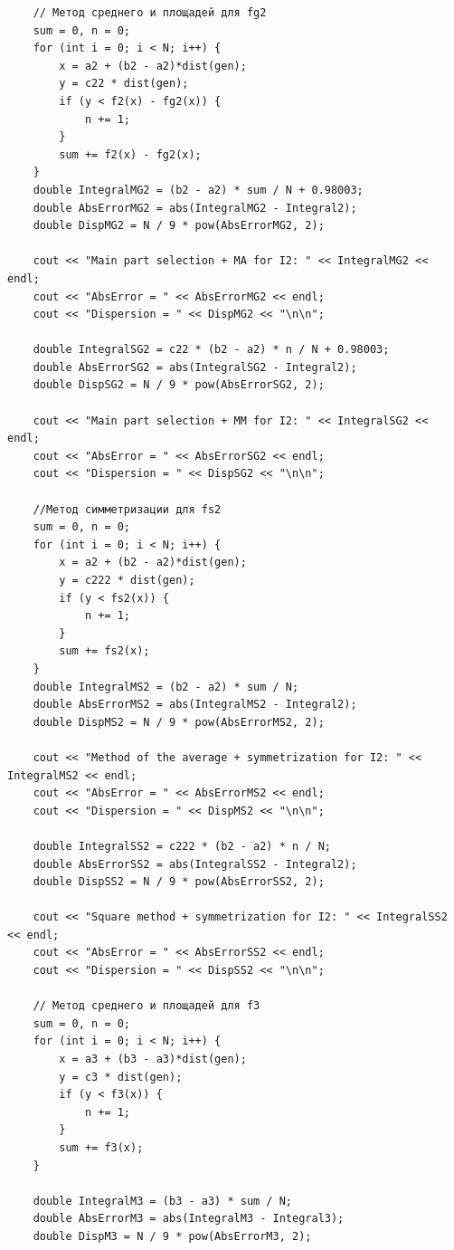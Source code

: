 \documentclass[
11pt,
master, %
subf, %
href, %
colorlinks=true, %
times, %
]{disser}
\begin{document}
{\begin{verbatim}
    // Метод среднего и площадей для fg2
    sum = 0, n = 0;
    for (int i = 0; i < N; i++) {
        x = a2 + (b2 - a2)*dist(gen);
        y = c22 * dist(gen);
        if (y < f2(x) - fg2(x)) {
            n += 1;
        }
        sum += f2(x) - fg2(x);
    }
    double IntegralMG2 = (b2 - a2) * sum / N + 0.98003;
    double AbsErrorMG2 = abs(IntegralMG2 - Integral2);
    double DispMG2 = N / 9 * pow(AbsErrorMG2, 2);

    cout << "Main part selection + MA for I2: " << IntegralMG2 << endl;
    cout << "AbsError = " << AbsErrorMG2 << endl;
    cout << "Dispersion = " << DispMG2 << "\n\n";

    double IntegralSG2 = c22 * (b2 - a2) * n / N + 0.98003;
    double AbsErrorSG2 = abs(IntegralSG2 - Integral2);
    double DispSG2 = N / 9 * pow(AbsErrorSG2, 2);

    cout << "Main part selection + MM for I2: " << IntegralSG2 << endl;
    cout << "AbsError = " << AbsErrorSG2 << endl;
    cout << "Dispersion = " << DispSG2 << "\n\n";

    //Метод симметризации для fs2
    sum = 0, n = 0;
    for (int i = 0; i < N; i++) {
        x = a2 + (b2 - a2)*dist(gen);
        y = c222 * dist(gen);
        if (y < fs2(x)) {
            n += 1;
        }
        sum += fs2(x);
    }
    double IntegralMS2 = (b2 - a2) * sum / N;
    double AbsErrorMS2 = abs(IntegralMS2 - Integral2);
    double DispMS2 = N / 9 * pow(AbsErrorMS2, 2);

    cout << "Method of the average + symmetrization for I2: " << IntegralMS2 << endl;
    cout << "AbsError = " << AbsErrorMS2 << endl;
    cout << "Dispersion = " << DispMS2 << "\n\n";

    double IntegralSS2 = c222 * (b2 - a2) * n / N;
    double AbsErrorSS2 = abs(IntegralSS2 - Integral2);
    double DispSS2 = N / 9 * pow(AbsErrorSS2, 2);

    cout << "Square method + symmetrization for I2: " << IntegralSS2 << endl;
    cout << "AbsError = " << AbsErrorSS2 << endl;
    cout << "Dispersion = " << DispSS2 << "\n\n";

    // Метод среднего и площадей для f3
    sum = 0, n = 0;
    for (int i = 0; i < N; i++) {
        x = a3 + (b3 - a3)*dist(gen);
        y = c3 * dist(gen);
        if (y < f3(x)) {
            n += 1;
        }
        sum += f3(x);
    }

    double IntegralM3 = (b3 - a3) * sum / N;
    double AbsErrorM3 = abs(IntegralM3 - Integral3);
    double DispM3 = N / 9 * pow(AbsErrorM3, 2);


\end{verbatim}}
\end{document}
